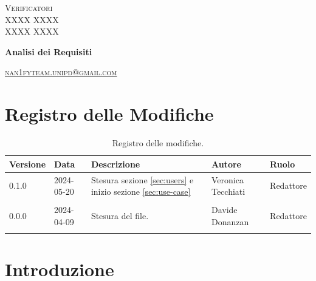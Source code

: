 \documentclass[8pt]{article}
\begin{document}
\begin{titlepage}
\begin{minipage}[t]{0.47\textwidth}
		{\large{\textsc{Verificatori}}
			\vspace{3mm}
			{\\\large{\textsc{XXXX XXXX}\\}} 
			{\large{\textsc{XXXX XXXX}}}
			
		}
		\vspace{4mm}\vspace{4mm}
	\end{minipage}
	\vspace{4cm}
	\begin{center}
		\begin{flushright}
			{\fontsize{30pt}{52pt}\selectfont \textbf{Analisi dei Requisiti\\}} %
		\end{flushright}
		\vspace{3cm}
	\end{center}
	\vspace{8 cm}
	{\small \textsc{\href{mailto: nan1fyteam.unipd@gmail.com}{nan1fyteam.unipd@gmail.com}}}
\end{titlepage}
\pagestyle{mystyle}
\section*{Registro delle Modifiche}
\begin{table}[ht!]
\hypersetup{hidelinks}
	\centering
	\begin{tabular}{p{1.2cm} p{2cm} p{6cm} p{3cm} p{2cm}}
		\toprule
		\textbf{Versione}& \textbf{Data} & \textbf{Descrizione} & \textbf{Autore} & \textbf{Ruolo} \\
		\midrule
            0.1.0 & 2024-05-20 & Stesura sezione \ref{sec:users} e inizio sezione \ref{sec:use-case} & Veronica Tecchiati & Redattore \\\\
		0.0.0 & 2024-04-09 & Stesura del file. & Davide Donanzan & Redattore \\\\
		\bottomrule
	\end{tabular}
	\caption{Registro delle modifiche.}
	\label{table:Registro delle modifiche}
\end{table}
\newpage
{\hypersetup{hidelinks} \tableofcontents}
\clearpage
\newpage
{\hypersetup{hidelinks} \listoffigures}
\newpage
{\hypersetup{hidelinks} \listoftables}
\newpage
\justifying
\section{Introduzione}
\end{document}
